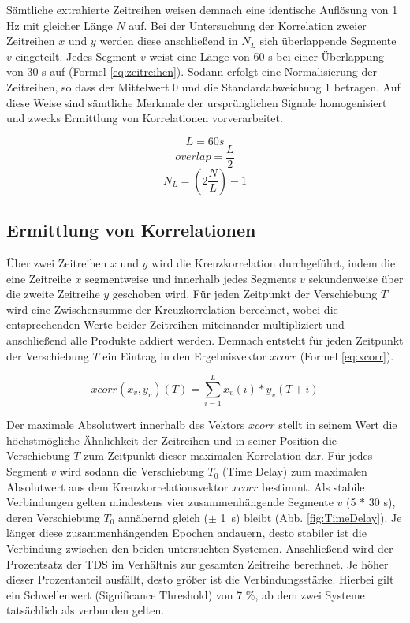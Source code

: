 Sämtliche extrahierte Zeitreihen weisen demnach eine identische Auflösung von 1 Hz mit gleicher Länge $N$ auf. Bei der Untersuchung der Korrelation zweier Zeitreihen $x$ und $y$ werden diese anschließend in $N_L$ sich überlappende Segmente $v$ eingeteilt. Jedes Segment $v$ weist eine Länge von 60 s bei einer Überlappung von 30 s auf (Formel \ref{eq:zeitreihen}). Sodann erfolgt eine Normalisierung der Zeitreihen, so dass der Mittelwert 0 und die Standardabweichung 1 betragen. Auf diese Weise sind sämtliche Merkmale der ursprünglichen Signale homogenisiert und zwecks Ermittlung von Korrelationen vorverarbeitet.\parencite{bashan_network_2012}

\begin{equation}
L = 60 s \nonumber
\end{equation}
\begin{equation}
overlap = \frac{L}{2} \nonumber
\end{equation}
\begin{equation}
N_L = (2\frac{N}{L})-1
	\label{eq:zeitreihen}
\end{equation}

\subsection{Ermittlung von Korrelationen}

Über zwei Zeitreihen $x$ und $y$ wird die Kreuzkorrelation durchgeführt, indem die eine Zeitreihe $x$ segmentweise und innerhalb jedes Segments $v$ sekundenweise über die zweite Zeitreihe $y$ geschoben wird. Für jeden Zeitpunkt der Verschiebung $T$ wird eine Zwischensumme der Kreuzkorrelation berechnet, wobei die entsprechenden Werte beider Zeitreihen miteinander multipliziert und anschließend alle Produkte addiert werden. Demnach entsteht für jeden Zeitpunkt der Verschiebung $T$ ein Eintrag in den Ergebnisvektor $xcorr$ (Formel \ref{eq:xcorr}). \parencite{bashan_network_2012}

\begin{equation}
xcorr(x_v, y_v)(T) = \sum \limits_{i=1}^L x_v(i)*y_v(T+i)
	\label{eq:xcorr}
\end{equation}

Der maximale Absolutwert innerhalb des Vektors $xcorr$ stellt in seinem Wert die höchstmögliche Ähnlichkeit der Zeitreihen und in seiner Position die Verschiebung $T$ zum Zeitpunkt dieser maximalen Korrelation dar. Für jedes Segment $v$ wird sodann die Verschiebung $T_0$ (Time Delay) zum maximalen Absolutwert aus dem Kreuzkorrelationsvektor $xcorr$ bestimmt. Als stabile Verbindungen gelten mindestens vier zusammenhängende Segmente $v$ (5 $*$ 30 s), deren Verschiebung $T_0$ annähernd gleich ($\pm$ 1~s) bleibt (Abb. \ref{fig:TimeDelay}). Je länger diese zusammenhängenden Epochen andauern, desto stabiler ist die Verbindung zwischen den beiden untersuchten Systemen. Anschließend wird der Prozentsatz der TDS im Verhältnis zur gesamten Zeitreihe berechnet. Je höher dieser Prozentanteil ausfällt, desto größer ist die Verbindungsstärke. Hierbei gilt ein Schwellenwert (Significance Threshold) von 7 \%, ab dem zwei Systeme tatsächlich als verbunden gelten. \parencite{bashan_network_2012}

